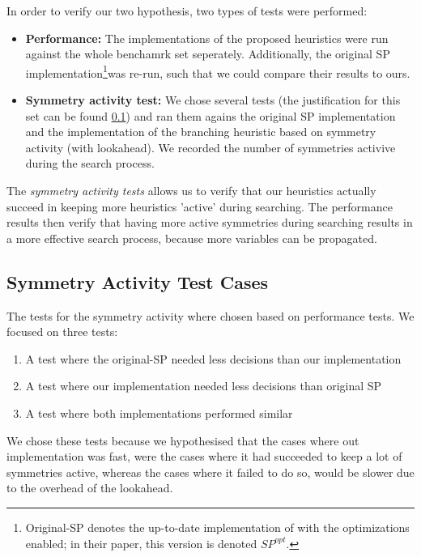 
In order to verify our two hypothesis, two types of tests were performed:

\begin{itemize}
	\item {\bf Performance:}
		The implementations of the proposed heuristics were run against the whole
		benchamrk set seperately.
		Additionally, the original SP implementation\footnote{
			Original-SP denotes the up-to-date implementation of \cite{devriendt2012symmetry} with
			the optimizations enabled; in their paper, this version is denoted $SP^{opt}$.
		}was re-run, such that we could compare their
		results to ours.

	\item {\bf Symmetry activity test:}
		We chose several tests (the justification for this set can be found
		\ref{ssec:sym_act_test_cases}) and ran them agains the original SP implementation and the
		implementation of the branching heuristic based on symmetry activity (with lookahead).
		We recorded the number of symmetries activive during the search process.

\end{itemize}

The \emph{symmetry activity tests} allows us to verify that our heuristics actually succeed in
keeping more heuristics 'active' during searching.
The performance results then verify that having more active symmetries during searching results in a
more effective search process, because more variables can be propagated.

\subsection{Symmetry Activity Test Cases}
\label{ssec:sym_act_test_cases}
	The tests for the symmetry activity where chosen based on performance tests.
	We focused on three tests:

	\begin{enumerate}
		\item A test where the original-SP needed less decisions than our implementation
		\item A test where our implementation needed less decisions than original SP
		\item A test where both implementations performed similar
	\end{enumerate}

	We chose these tests because we hypothesised that the cases where out implementation was fast,
	were the cases where it had succeeded to keep a lot of symmetries active, whereas the cases
	where it failed to do so, would be slower due to the overhead of the lookahead.

